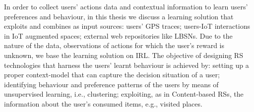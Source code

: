 In order to collect users' actions data and contextual information to learn users' preferences and behaviour, in this thesis we discuss a learning solution that exploits and combines as input sources: users' GPS traces; users-IoT interactions in IoT augmented spaces; external web repositories like LBSNs. Due to the nature of the data, observations of actions for which the user's reward is unknown, we base the learning solution on IRL.
The objective of designing RS technologies that harness the users' learnt behaviour is achieved by: setting up a proper context-model that can capture the decision situation of a user; identifying behaviour and preference patterns of the users by means of unsupervised learning, i.e., clustering; exploiting, as in Content-based RSs, the information about the user's consumed items, e.g., visited places.

